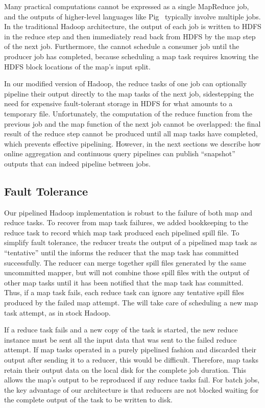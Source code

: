 Many practical computations cannot be expressed as a single MapReduce job, and
the outputs of higher-level languages like Pig~\cite{pig} typically involve
multiple jobs.  In the traditional Hadoop architecture, the output of each job
is written to HDFS in the reduce step and then immediately read back from HDFS
by the map step of the next job. Furthermore, the {\JT} cannot schedule a
consumer job until the producer job has completed, because scheduling a map task
requires knowing the HDFS block locations of the map's input split.

In our modified version of Hadoop, the reduce tasks of one job can optionally
pipeline their output directly to the map tasks of the next job, sidestepping
the need for expensive fault-tolerant storage in HDFS for what amounts to a
temporary file. Unfortunately, the computation of the reduce function from the
previous job and the map function of the next job cannot be overlapped: the
final result of the reduce step cannot be produced until all map tasks have
completed, which prevents effective pipelining. However, in the next sections we
describe how online aggregation and continuous query pipelines can publish
``snapshot'' outputs that can indeed pipeline between jobs.

\subsection{Fault Tolerance}
\label{ch:hop:sec:ft}


Our pipelined Hadoop implementation is robust to the failure of both
map and reduce tasks. To recover from map task failures, we added
bookkeeping to the reduce task to record which map task produced each
pipelined spill file. To simplify fault tolerance, the reducer treats
the output of a pipelined map task as ``tentative'' until the {\JT}
informs the reducer that the map task has committed successfully. The
reducer can merge together spill files generated by the same
uncommitted mapper, but will not combine those spill files with the
output of other map tasks until it has been notified that the map task
has committed. Thus, if a map task fails, each reduce task can ignore
any tentative spill files produced by the failed map attempt. The
{\JT} will take care of scheduling a new map task attempt, as in stock
Hadoop. 

If a reduce task fails and a new copy of the task is started, the new
reduce instance must be sent all the input data that was sent to the
failed reduce attempt. If map tasks operated in a purely pipelined
fashion and discarded their output after sending it to a reducer, this
would be difficult. Therefore, map tasks retain their output data on
the local disk for the complete job duration. This allows the map's output to be 
reproduced if any reduce tasks fail. For batch jobs, the key advantage of our architecture is
that reducers are not blocked waiting for the complete output of the
task to be written to disk.

